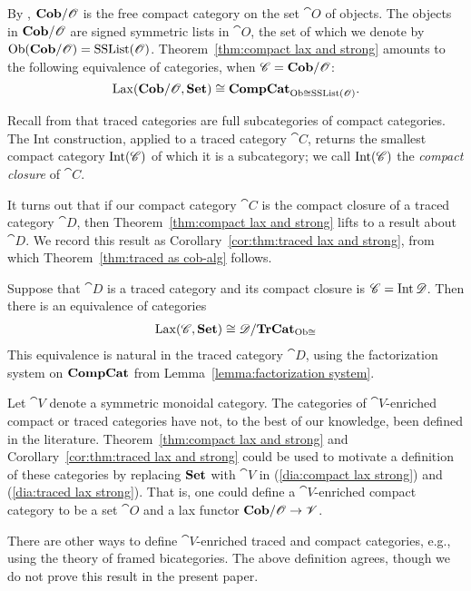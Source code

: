 \documentclass[12pt,oneside,article,draft]{memoir}
\begin{document}
By \cite{Abramsky}, $\mathbf{Cob}/\mathscr{O}$ is the free compact category on the set $\cat{O}$ of objects. The objects in $\mathbf{Cob}/\mathscr{O}$ are  signed symmetric lists in $\cat{O}$, the set of which we denote by $\operatorname{Ob}(\mathbf{Cob}/\mathscr{O})=\textnormal{SSList}(\mathscr{O})$. Theorem~\ref{thm:compact lax and strong} amounts to the following equivalence of categories, when $\mathscr{C}=\mathbf{Cob}/\mathscr{O}$:
$$\operatorname{Lax}(\mathbf{Cob}/\mathscr{O},\mathbf{Set})\cong\mathbf{CompCat}_{{\operatorname{Ob}\cong}\textnormal{SSList}(\mathscr{O})}.$$

Recall from \cite{JoyalStreetVerity} that traced categories are full subcategories of compact categories. The Int construction, applied to a traced category $\cat{C}$, returns the smallest compact category $\operatorname{Int}(\mathscr{C})$ of which it is a subcategory; we call $\operatorname{Int}(\mathscr{C})$ the \emph{compact closure} of $\cat{C}$. 

It turns out that if our compact category $\cat{C}$ is the compact closure of a traced category $\cat{D}$, then Theorem~\ref{thm:compact lax and strong} lifts to a result about $\cat{D}$. We record this result as Corollary~\ref{cor:thm:traced lax and strong}, from which Theorem~\ref{thm:traced as cob-alg} follows. 

\begin{corollary}\label{cor:thm:traced lax and strong}
Suppose that $\cat{D}$ is a traced category and its compact closure is $\mathscr{C}=\operatorname{Int}\mathscr{D}$. Then there is an equivalence of categories
\begin{align}\label{dia:traced lax strong}
\operatorname{Lax}(\mathscr{C},\mathbf{Set})\cong\mathscr{D}/\mathbf{TrCat}_{{\operatorname{Ob}\cong}}
\end{align}
This equivalence is natural in the traced category $\cat{D}$, using the factorization system on $\mathbf{CompCat}$ from Lemma~\ref{lemma:factorization system}.
\end{corollary}

\begin{remark}

Let $\cat{V}$ denote a symmetric monoidal category. The categories of $\cat{V}$-enriched compact or traced categories have not, to the best of our knowledge, been defined in the literature. Theorem~\ref{thm:compact lax and strong} and Corollary~\ref{cor:thm:traced lax and strong} could be used to motivate a definition of these categories by replacing $\mathbf{Set}$ with $\cat{V}$ in (\ref{dia:compact lax strong}) and (\ref{dia:traced lax strong}). That is, one could define a $\cat{V}$-enriched compact category to be a set $\cat{O}$ and a lax functor $\mathbf{Cob}/\mathscr{O}\to\mathscr{V}$. 

There are other ways to define $\cat{V}$-enriched traced and compact categories, e.g., using the theory of framed bicategories. The above definition agrees, though we do not prove this result in the present paper.

\end{remark}
\end{document}
